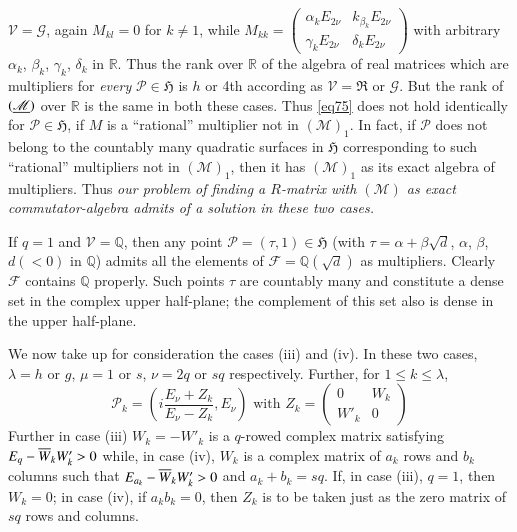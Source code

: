 $\mathscr{V}=\mathscr{G}$, again $M_{kl}=0$ for $k\neq 1$, while
$M_{kk}=\left(
\begin{smallmatrix} \alpha_{k}E_{2\nu} &
  k_{\beta_{k}}E_{2\nu}\\ \gamma_{k}E_{2\nu} & \delta_{k}E_{2\nu}
\end{smallmatrix}\right)$ with arbitrary $\alpha_{k}$, $\beta_{k}$,
$\gamma_{k}$, $\delta_{k}$ in $\mathbb{R}$. Thus the rank over
$\mathbb{R}$ of the algebra of real matrices which are multipliers for
{\em every} $\mathscr{P}\in\mathfrak{H}$ is $h$ or
4th according as $\mathscr{V}=\mathfrak{R}$ or $\mathscr{G}$. But the
rank of $(\underline{\mathscr{M}})$ over $\mathbb{R}$ is the same in both
these cases. Thus \eqref{eq75} does not hold identically for
$\mathscr{P}\in\mathfrak{H}$, if $M$ is a ``rational'' multiplier not
in $(\mathscr{M})_{1}$. In fact, if $\mathscr{P}$ does not belong to
the countably many quadratic surfaces in $\mathfrak{H}$ corresponding
to such ``rational'' multipliers not in $(\mathscr{M})_{1}$, then it
has $(\mathscr{M})_{1}$ as its exact algebra of multipliers. Thus {\em
  our problem of finding a $R$-matrix with $(\mathscr{M})$ as exact
  commutator-algebra admits of a solution in these two cases.}

\begin{example*}
If $q=1$ and $\mathscr{V}=\mathbb{Q}$, then any point
$\mathscr{P}=(\tau,1)\in\mathfrak{H}$ (with
$\tau=\alpha+\beta\sqrt{d}$, $\alpha$, $\beta$, $d(<0)$ in
$\mathbb{Q}$) admits all the elements of
$\mathscr{F}=\mathbb{Q}(\sqrt{d})$ as multipliers. Clearly
$\mathscr{F}$ contains $\mathbb{Q}$ properly. Such points $\tau$ are
countably many and constitute a dense set in the complex upper
half-plane; the complement of this set also is dense in the upper half-plane.
\end{example*}

We now take up for consideration the cases (iii) and (iv). In these
two cases, $\lambda=h$ or $g$, $\mu=1$ or $s$, $\nu=2q$ or $sq$
respectively. Further, for $1\leq k\leq \lambda$,
$$
\mathscr{P}_{k}=
\left(i\frac{E_{\nu}+Z_{k}}{E_{\nu}-Z_{k}},E_{\nu}\right)\text{ \ with
  \ } Z_{k}=
\begin{pmatrix}
0 & W_{k}\\
W'_{k} & 0
\end{pmatrix}
$$\pageoriginale
Further in case (iii) $W_{k}=-W'_{k}$ is a $q$-rowed complex matrix
satisfying $E_{q}-\overline{W}_{k}W'_{k}>0$ while, in case (iv), $W_{k}$ is
a complex matrix of $a_{k}$ rows and $b_{k}$ columns such that
$E_{a_{k}}-\overline{W}_{k}W'_{k}>0$ and $a_{k}+b_{k}=sq$. If, in case
(iii), $q=1$, then $W_{k}=0$; in case (iv), if $a_{k}b_{k}=0$, then
$Z_{k}$ is to be taken just as the zero matrix of $sq$ rows and
columns. 

